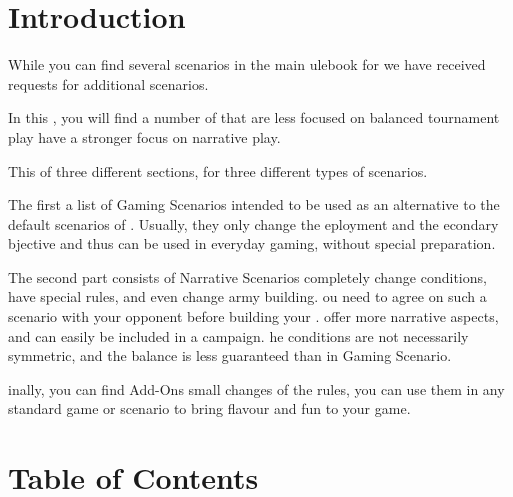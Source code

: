 \section*{Introduction}
\label{introduction}

While you can find several scenarios in the main ulebook for \nameofthegame{}  we have received requests for additional scenarios.

In this , you will find a number of that are less focused on balanced tournament play  have a stronger focus on narrative play.

This  of three different sections, for three different types of scenarios.

The first  a list of  Gaming Scenarios  intended to be used as an alternative to the default scenarios of \nameofthegame{}. Usually, they only change the eployment and the econdary bjective and thus can be used in everyday gaming, without  special preparation.

The second part consists of Narrative Scenarios completely change  conditions, have special rules, and  even change  army building. ou need to agree on such a scenario with your opponent before building your .  offer more narrative aspects, and can easily be included in a campaign. he  conditions are not necessarily symmetric, and the balance is less guaranteed than in Gaming Scenario.

inally, you can find  Add-Ons  small changes of the rules,  you can use them in any standard game or scenario to bring  flavour and fun to your game.


\section*{Table of Contents}


